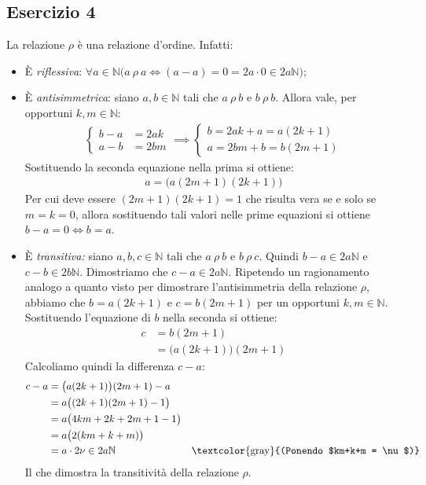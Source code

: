 \subsection*{Esercizio 4}
La relazione $\rho$ è una relazione d'ordine. Infatti:
\begin{itemize}
	\item È \textit{riflessiva}: $\forall a \in \mathbb{N} \bigl( a \ \rho \ a \iff (a-a)=0=2a\cdot 0 \in 2a\mathbb{N}\bigr)$;
	\item È \textit{antisimmetrica}: siano $a,b \in \mathbb{N}$ tali che $a \ \rho \ b$ e $b \ \rho \ b$. Allora vale, per opportuni $k,m \in \mathbb{N}$:
	\begin{align*}
		\begin{cases}
			b-a &= 2ak \\
		a-b &= 2bm
		\end{cases}
	\implies 
	\begin{cases}
		b = 2ak+a = a(2k+1)\\
		a = 2bm+b = b(2m+1)
	\end{cases}
	\end{align*}
Sostituendo la seconda equazione nella prima si ottiene:
\begin{align*}
	a = \bigl(a (2m+1)(2k+1)\bigr)
\end{align*}
Per cui deve essere $(2m+1)(2k+1)=1$ che risulta vera se e solo se $m=k=0$, allora sostituendo tali valori nelle prime equazioni si ottiene $b-a=0 \iff b=a$.
\item È \textit{transitiva:} siano $a,b,c \in \mathbb{N}$ tali che $a \ \rho \ b$ e $b \ \rho \ c$. Quindi $b-a \in 2a\mathbb{N}$ e $c-b \in 2b\mathbb{N}$. Dimostriamo che $c-a \in 2a\mathbb{N}$. Ripetendo un ragionamento analogo a quanto visto per dimostrare l'antisimmetria della relazione $\rho$, abbiamo che $b = a(2k+1)$ e $c=b(2m+1)$ per un opportuni $k,m \in \mathbb{N}$. Sostituendo l'equazione di $b$ nella seconda si ottiene:
\begin{align*}
	c&=b(2m+1) \\
	&=\bigl(a(2k+1)\bigr)(2m+1)
\end{align*}
Calcoliamo quindi la differenza $c-a$:
\begin{align*}
	c-a &= \bigl(a(2k+1)\bigr)(2m+1) -a \\
	&= a \bigl((2k+1)(2m+1)-1\bigr) \\
	&= a \bigl(4km + 2k +2m + 1 -1\bigr) \\
	&= a \bigl(2(km+k+m)\bigr) \\
	&= a \cdot 2 \nu \in 2a \mathbb{N} & \text{\textcolor{gray}{(Ponendo $km+k+m = \nu $)}}
\end{align*}
Il che dimostra la transitività della relazione $\rho$.
\end{itemize}
